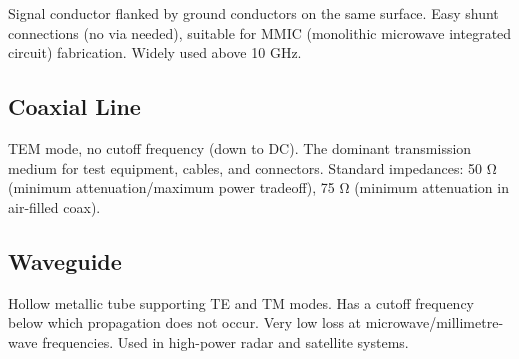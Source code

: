 				

Signal conductor flanked by ground conductors on the same surface. Easy shunt connections (no via needed), suitable for MMIC (monolithic microwave integrated circuit) fabrication. Widely used above 10 GHz.

				

\subsection{Coaxial Line}

				

TEM mode, no cutoff frequency (down to DC). The dominant transmission medium for test equipment, cables, and connectors. Standard impedances: 50 Ω (minimum attenuation/maximum power tradeoff), 75 Ω (minimum attenuation in air-filled coax).

				

\subsection{Waveguide}

				

Hollow metallic tube supporting TE and TM modes. Has a cutoff frequency below which propagation does not occur. Very low loss at microwave/millimetre-wave frequencies. Used in high-power radar and satellite systems.




